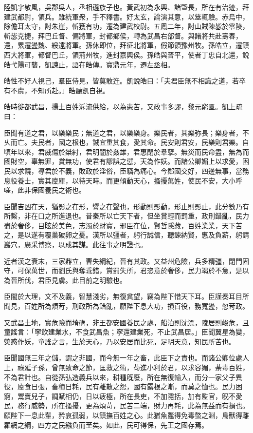 
\begin{pinyinscope}
陸凱字敬風，吳郡吳人，丞相遜族子也。黃武初為永興、諸曁長，所在有治迹，拜建武都尉，領兵。雖統軍衆，手不釋書。好太玄，論演其意，以筮輒驗。赤烏中，除儋耳太守，討朱崖，斬獲有功，遷為建武校尉。五鳳二年，討山賊陳毖於零陵，斬毖克捷，拜巴丘督、偏將軍，封都鄉侯，轉為武昌右部督。與諸將共赴壽春，還，累遷盪魏、綏遠將軍。孫休即位，拜征北將軍，假節領豫州牧。孫皓立，遷鎮西大將軍，都督巴丘，領荊州牧，進封嘉興侯。孫皓與晉平，使者丁忠自北還，說皓弋陽可襲，凱諫止，語在皓傳。寶鼎元年，遷左丞相。

皓性不好人視己，羣臣侍見，皆莫敢迕。凱說皓曰：「夫君臣無不相識之道，若卒有不虞，不知所赴。」皓聽凱自視。

皓時徙都武昌，揚土百姓泝流供給，以為患苦，又政事多謬，黎元窮匱。凱上疏曰：

臣聞有道之君，以樂樂民；無道之君，以樂樂身。樂民者，其樂弥長；樂身者，不乆而亡。夫民者，國之根也，誠宜重其食，愛其命。民安則君安，民樂則君樂。自頃年以來，君威傷於桀紂，君明闇於姦雄，君惠閉於羣孽。無災而民命盡，無為而國財空，辜無罪，賞無功，使君有謬誤之愆，天為作妖。而諸公卿媚上以求愛，困民以求饒，導君於不義，敗政於淫俗，臣竊為痛心。今鄰國交好，四邊無事，當務息役養士，實其廩庫，以待天時。而更傾動天心，搔擾萬姓，使民不安，大小呼嗟，此非保國養民之術也。

臣聞吉凶在天，猶影之在形，響之在聲也，形動則影動，形止則影止，此分數乃有所繫，非在口之所進退也。昔秦所以亡天下者，但坐賞輕而罰重，政刑錯亂，民力盡於奢侈，目眩於美色，志濁於財寶，邪臣在位，賢哲隱藏，百姓業業，天下苦之，是以遂有覆巢破卵之憂。漢所以彊者，躬行誠信，聽諫納賢，惠及負薪，躬請巖穴，廣采博察，以成其謀。此往事之明證也。

近者漢之衰末，三家鼎立，曹失綱紀，晉有其政。又益州危險，兵多精彊，閉門固守，可保萬世，而劉氏與奪乖錯，賞罰失所，君恣意於奢侈，民力竭於不急，是以為晉所伐，君臣見虜。此目前之明驗也。

臣闇於大理，文不及義，智慧淺劣，無復兾望，竊為陛下惜天下耳。臣謹奏耳目所聞見，百姓所為煩苛，刑政所為錯亂，願陛下息大功，損百役，務寬盪，忽苛政。

又武昌土地，實危險而塉确，非王都安國養民之處，船泊則沈漂，陵居則峻危，且童謠言：「寧飲建業水，不食武昌魚；寧還建業死，不止武昌居。」臣聞翼星為變，熒惑作妖，童謠之言，生於天心，乃以安居而比死，足明天意，知民所苦也。

臣聞國無三年之儲，謂之非國，而今無一年之畜，此臣下之責也。而諸公卿位處人上，祿延子孫，曾無致命之節，匡救之術，苟進小利於君，以求容媚，荼毒百姓，不為君計也。自從孫弘造義兵以來，耕種旣廢，所在無復輸入，而分一家父子異役，廩食日張，畜積日耗，民有離散之怨，國有露根之漸，而莫之恤也。民力困窮，鬻賣兒子，調賦相仍，日以疲極，所在長吏，不加隱括，加有監官，旣不愛民，務行威勢，所在搔擾，更為煩苛，民苦二端，財力再耗，此為無益而有損也。願陛下一息此輩，矜哀孤弱，以鎮撫百姓之心。此猶魚龞得免毒螫之淵，鳥獸得離羅網之綱，四方之民繈負而至矣。如此，民可得保，先王之國存焉。


\end{pinyinscope}
